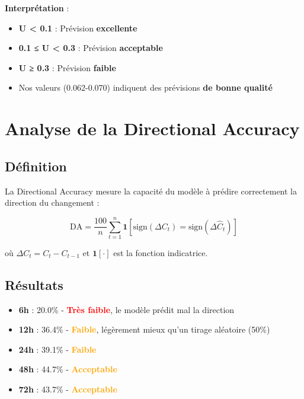 \documentclass[12pt,a4paper]{article}
\begin{document}
\textbf{Interprétation} :
\begin{itemize}
    \item \textbf{U < 0.1} : Prévision \textbf{excellente}
    \item \textbf{0.1 ≤ U < 0.3} : Prévision \textbf{acceptable}
    \item \textbf{U ≥ 0.3} : Prévision \textbf{faible}
    \item Nos valeurs (0.062-0.070) indiquent des prévisions \textbf{de bonne qualité}
\end{itemize}

\section{Analyse de la Directional Accuracy}

\subsection{Définition}

La Directional Accuracy mesure la capacité du modèle à prédire correctement la direction du changement :

\begin{equation}
    \text{DA} = \frac{100}{n}\sum_{t=1}^{n}\mathbf{1}[\text{sign}(\Delta C_t) = \text{sign}(\Delta \hat{C}_t)]
\end{equation}

où $\Delta C_t = C_t - C_{t-1}$ et $\mathbf{1}[\cdot]$ est la fonction indicatrice.

\subsection{Résultats}

\begin{itemize}
    \item \textbf{6h} : 20.0\% - \textcolor{red}{\textbf{Très faible}}, le modèle prédit mal la direction
    \item \textbf{12h} : 36.4\% - \textcolor{orange}{\textbf{Faible}}, légèrement mieux qu'un tirage aléatoire (50\%)
    \item \textbf{24h} : 39.1\% - \textcolor{orange}{\textbf{Faible}}
    \item \textbf{48h} : 44.7\% - \textcolor{orange}{\textbf{Acceptable}}
    \item \textbf{72h} : 43.7\% - \textcolor{orange}{\textbf{Acceptable}}
\end{itemize}
\end{document}

